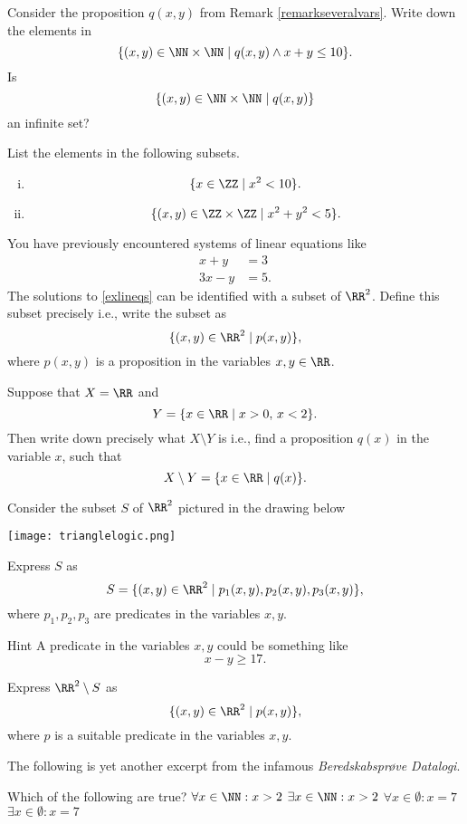 \documentclass{article}
\begin{document}
\beginshex
Consider the proposition $q(x, y)$ from Remark \ref{remarkseveralvars}. Write
down the elements in
$$
\{(x, y)\in \NN\times \NN \mid q(x, y) \land x + y \leq 10\}.
$$
Is
$$
\{(x, y) \in \NN\times \NN\mid q(x, y)\}
$$
an infinite set?
\endshex

\beginshex
List the elements in the following subsets.
\begin{enumerate}[(i)]
  \item
$$
\{x\in \ZZ \mid x^2 < 10\}.
$$
\item
  $$
  \{(x, y)\in \ZZ\times \ZZ \mid x^2 + y^2 < 5\}.
  $$
\end{enumerate}
\endshex

\beginshex
You have previously encountered systems of linear equations like
\begin{align}\label{exlineqs}
  x + y &= 3\\
  3x - y &=  5. 
\end{align}
The solutions to \eqref{exlineqs} can be identified with a subset of
$\RR^2$. Define this subset precisely i.e., write the subset as
$$
\{(x, y)\in \RR^2 \mid p(x, y)\},
$$
where $p(x, y)$ is a proposition in the variables $x, y\in \RR$.
\endshex

\beginshex
Suppose that $X = \RR$ and
$$
Y = \{x\in \RR \mid x > 0,\, x < 2\}.
$$
Then write down precisely what $X\setminus Y$ is i.e., find a proposition $q(x)$
in the variable $x$, such that
$$
X\setminus Y = \{x\in \RR \mid q(x)\}.
$$
\endshex

\beginshex
Consider the subset $S$ of $\RR^2$ pictured in the drawing below

\texttt{[image: trianglelogic.png]}

Express $S$ as
$$
S = \{(x, y)\in \RR^2 \mid p_1(x, y), p_2(x, y), p_3(x, y)\},
$$
where $p_1, p_2, p_3$ are predicates in the variables $x, y$.

\begin{hideinbutton}{Hint}
  A predicate in the variables $x, y$ could be something like
  $$
  x -y \geq 17.
  $$
\end{hideinbutton}

Express $\RR^2\setminus S$ as
$$
\{(x, y)\in \RR^2 \mid p(x, y)\},
$$
where $p$ is a suitable predicate in the variables $x, y$.
\endshex

The following is yet another excerpt from the infamous \emph{Beredskabsprøve Datalogi}.

\begin{quizexercise}[showhide]
\begin{quiz}
\question
Which of the following are true?
$\forall x\in \NN: x > 2$
$\exists x\in \NN: x > 2$
$\forall x\in \emptyset: x = 7$
$\exists x\in \emptyset: x = 7$
\end{quiz}
\end{quizexercise}
\end{document}
